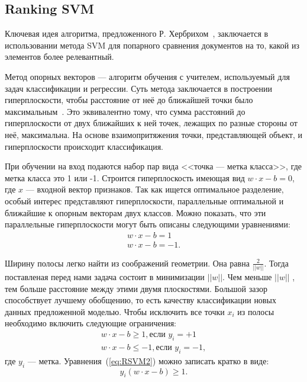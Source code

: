 \subsection{Ranking SVM}

Ключевая идея алгоритма, предложенного Р. Хербрихом~\cite{RankSVM}, заключается в использовании метода SVM для попарного сравнения документов на то, какой из элементов более релевантный. 

Метод опорных векторов --- алгоритм обучения с учителем, используемый для задач классификации и регрессии. Суть метода заключается в построении гиперплоскости, чтобы расстояние от неё до ближайшей точки было максимальным~\cite{ML_no_wors}. Это эквивалентно тому, что сумма расстояний до гиперплоскости от двух ближайших к ней точек, лежащих по разные стороны от неё, максимальна. На основе взаимопритяжения точки, представляющей объект, и гиперплоскости происходит  классификация.

При обучении на вход подаются набор пар вида <<точка --- метка класса>>, где метка класса это 1 или -1. Строится гиперплоскость имеющая вид $w\cdot x - b = 0$, где $x$ ---  входной вектор признаков. Так как ищется оптимальное разделение, особый интерес представляют гиперплоскости, параллельные оптимальной и ближайшие к опорным векторам двух классов. 
Можно показать, что эти параллельные гиперплоскости могут быть описаны следующими уравнениями:
\begin{equation}
		\label{eq:RSVM1}
	\begin{aligned}
		w \cdot x - b = 1  \\
		w \cdot x - b = - 1 .
	\end{aligned}
\end{equation}

Ширину полосы легко найти из соображений геометрии. Она равна $\frac{2}{||w||}$. Тогда поставленая перед нами задача состоит в минимизации $||w||$. Чем меньше $||w||$ , тем больше расстояние между этими двумя плоскостями. Большой зазор способствует лучшему обобщению, то есть качеству классификации новых данных предложенной моделью. Чтобы исключить все точки $x_i$ из полосы необходимо включить следующие ограничения:
\begin{equation}
	\label{eq:RSVM2}
	\begin{aligned}
	w \cdot x - b \geq 1, \text{если $y_i = +1$}  \\
	w \cdot x - b \leq -1, \text{если $y_i = -1$} ,
	\end{aligned}
\end{equation}
где $y_i$ --- метка.
Уравнения~(\ref{eq:RSVM2}) можно записать кратко в виде:
\begin{equation}
	\label{eq:RSVM3}
	y_i(w \cdot x - b) \geq 1.
\end{equation}

